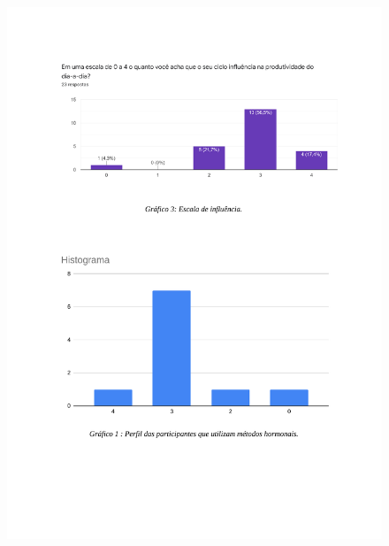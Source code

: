 \begin{apendicesenv}
    \begin{figure}[h]
        \centering
        \includegraphics[keepaspectratio=true,scale=0.7]{figuras/Tab8.pdf}
    \end{figure}
    

\end{apendicesenv}
